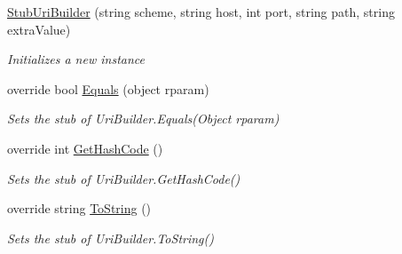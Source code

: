 \begin{DoxyCompactItemize}
\hyperlink{class_system_1_1_fakes_1_1_stub_uri_builder_aee11a8873452ee8e8398a2be5842f095}{Stub\-Uri\-Builder} (string scheme, string host, int port, string path, string extra\-Value)
\begin{DoxyCompactList}\small\item\em Initializes a new instance\end{DoxyCompactList}\item 
override bool \hyperlink{class_system_1_1_fakes_1_1_stub_uri_builder_a6ab990e3b7c6f55fdb2adfb6ffcc0d99}{Equals} (object rparam)
\begin{DoxyCompactList}\small\item\em Sets the stub of Uri\-Builder.\-Equals(\-Object rparam)\end{DoxyCompactList}\item 
override int \hyperlink{class_system_1_1_fakes_1_1_stub_uri_builder_adc5b5ecf3e41168c6d97edd95a218a12}{Get\-Hash\-Code} ()
\begin{DoxyCompactList}\small\item\em Sets the stub of Uri\-Builder.\-Get\-Hash\-Code()\end{DoxyCompactList}\item 
override string \hyperlink{class_system_1_1_fakes_1_1_stub_uri_builder_a3b0525831d4b270f6c51b24c05561cd0}{To\-String} ()
\begin{DoxyCompactList}\small\item\em Sets the stub of Uri\-Builder.\-To\-String()\end{DoxyCompactList}\end{DoxyCompactItemize}
